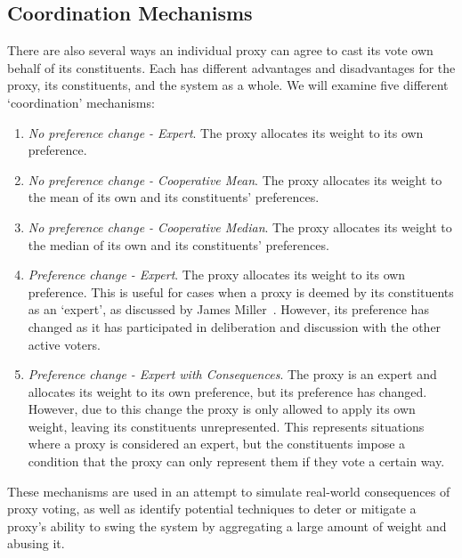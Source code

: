 
\subsection{Coordination Mechanisms}\label{subsec:coordination-mechanisms}
There are also several ways an individual proxy can agree to cast its vote own behalf
of its constituents.
Each has different advantages and disadvantages for the proxy, its constituents, and
the system as a whole.
We will examine five different `coordination' mechanisms:
\begin{enumerate}
    \item {
        \textit{No preference change - Expert}.
        The proxy allocates its weight to its own preference.
    }
    \item {
        \textit{No preference change - Cooperative Mean}.
        The proxy allocates its weight to the mean of its own and its constituents'
        preferences.
    }
    \item {
        \textit{No preference change - Cooperative Median}.
        The proxy allocates its weight to the median of its own and its constituents'
        preferences.
    }
    \item {
        \textit{Preference change - Expert}.
        The proxy allocates its weight to its own preference.
        This is useful for cases when a proxy is deemed by its constituents as an
        `expert', as discussed by James Miller~\cite{Miller1969}.
        However, its preference has changed as it has participated in deliberation
        and discussion with the other active voters.
    }
    \item {
        \textit{Preference change - Expert with Consequences}.
        The proxy is an expert and allocates its weight to its own preference, but its
        preference has changed.
        However, due to this change the proxy is only allowed to apply its own
        weight, leaving its constituents unrepresented.
        This represents situations where a proxy is considered an expert, but the
        constituents impose a condition that the proxy can only represent them if
        they vote a certain way.
    }
\end{enumerate}
These mechanisms are used in an attempt to simulate real-world consequences of proxy
voting, as well as identify potential techniques to deter or mitigate a proxy's
ability to swing the system by aggregating a large amount of weight and abusing it.
